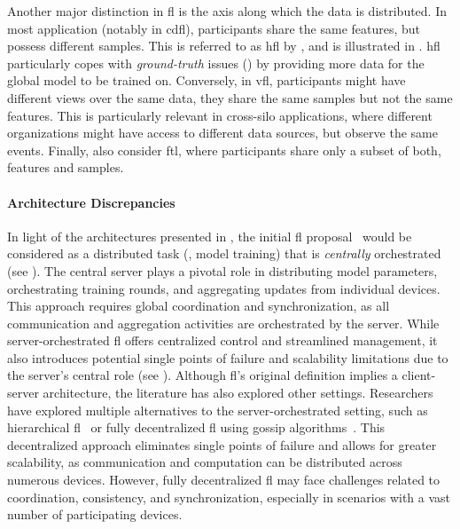 Another major distinction in \gls{fl} is the axis along which the data is distributed.
In most application (notably in \gls{cdfl}), participants share the same features, but possess different samples.
This is referred to as \gls{hfl} by \textcite{yang_FederatedMachineLearning_2019}, and is illustrated in .
\Gls{hfl} particularly copes with \emph{ground-truth} issues () by providing more data for the global model to be trained on.
Conversely, in \gls{vfl}, participants might have different views over the same data, \ie they share the same samples but not the same features.
This is particularly relevant in cross-silo applications, where different organizations might have access to different data sources, but observe the same events.
Finally, \textcite{yang_FederatedMachineLearning_2019} also consider \gls{ftl}, where participants share only a subset of both, features and samples.


\paragraph{Architecture Discrepancies}

In light of the architectures presented in , the initial \gls{fl} proposal~\cite{mcmahan_Communicationefficientlearningdeep_2017} would be considered as a distributed task (\ie, model training) that is \emph{centrally} orchestrated (see ).
The central server plays a pivotal role in distributing model parameters, orchestrating training rounds, and aggregating updates from individual devices.
This approach requires global coordination and synchronization, as all communication and aggregation activities are orchestrated by the server.
While server-orchestrated \gls{fl} offers centralized control and streamlined management, it also introduces potential single points of failure and scalability limitations due to the server's central role (see ).
Although \gls{fl}'s original definition implies a client-server architecture, the literature has also explored other settings.
Researchers have explored multiple alternatives to the server-orchestrated setting, such as hierarchical \gls{fl}~\cite{liu_ClientEdgeCloudHierarchicalFederated_2020} or fully decentralized \gls{fl} using gossip algorithms~\cite{tang_GossipFLDecentralizedFederated_2023}.
This decentralized approach eliminates single points of failure and allows for greater scalability, as communication and computation can be distributed across numerous devices.
However, fully decentralized \gls{fl} may face challenges related to coordination, consistency, and synchronization, especially in scenarios with a vast number of participating devices.


